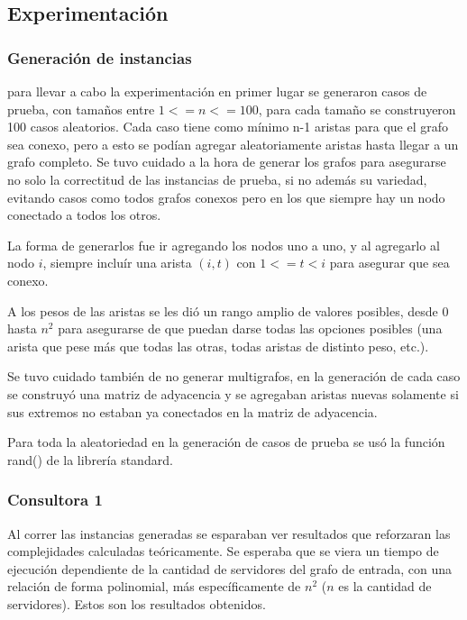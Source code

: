 \documentclass[A4paper,oneside,fleqn,11pt]{article}
\theoremstyle{definition}
\begin{document}
\subsection{Experimentación}

\subsubsection{Generación de instancias}

para llevar a cabo la experimentación en primer lugar se generaron casos de prueba, con tamaños entre $1<=n<=100$, para cada tamaño se construyeron 100 casos aleatorios. Cada caso tiene como mínimo n-1 aristas para que el grafo sea conexo, pero a esto se podían agregar aleatoriamente aristas hasta llegar a un grafo completo. Se tuvo cuidado a la hora de generar los grafos para asegurarse no solo la correctitud de las instancias de prueba, si no además su variedad, evitando casos como todos grafos conexos pero en los que siempre hay un nodo conectado a todos los otros.

La forma de generarlos fue ir agregando los nodos uno a uno, y al agregarlo al nodo $i$, siempre incluír una arista $(i,t)$ con $1<=t<i$ para asegurar que sea conexo.

A los pesos de las aristas se les dió un rango amplio de valores posibles, desde 0 hasta $n^2$ para asegurarse de que puedan darse todas las opciones posibles (una arista que pese más que todas las otras, todas aristas de distinto peso, etc.).

Se tuvo cuidado también de no generar multigrafos, en la generación de cada caso se construyó una matriz de adyacencia y se agregaban aristas nuevas solamente si sus extremos no estaban ya conectados en la matriz de adyacencia.

Para toda la aleatoriedad en la generación de casos de prueba se usó la función rand() de la librería standard.


\subsubsection{Consultora 1}

Al correr las instancias generadas se esparaban ver resultados que reforzaran las complejidades calculadas teóricamente. Se esperaba que se viera un tiempo de ejecución dependiente de la cantidad de servidores del grafo de entrada, con una relación de forma polinomial, más específicamente de $n^2$ ($n$ es la cantidad de servidores). Estos son los resultados obtenidos. 
\end{document}
